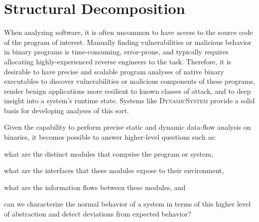 \documentclass[letterpaper,twoside,11pt,headings=small]{scrartcl}
\newcommand{\dynamicsys}{\textsc{DynamicSystem}\xspace}
\begin{document}


\section{Structural Decomposition}
\label{sec:research:structure}

\cite{csallner:icse2008:dysy}
\cite{krka:icsa2010:inference}
\cite{chipounov:asplos2011:s2e}

When analyzing software, it is often uncommon to have access to the source
code of the program of interest.  Manually finding vulnerabilities or
malicious behavior in binary programs is time-consuming, error-prone, and
typically requires allocating highly-experienced reverse engineers to the
task. Therefore, it is desirable to have precise and scalable program analyses
of native binary executables to discover vulnerabilities or malicious
components of these programs, render benign applications more resilient to
known classes of attack, and to deep insight into a system's runtime state.
Systems like \dynamicsys provide a solid basis for developing analyses of this
sort.

Given the capability to perform precise static and dynamic data-flow analysis
on binaries, it becomes possible to answer higher-level questions such as:
\begin{inparaenum}[i)]
    \item what are the distinct modules that comprise the program or system,
    \item what are the interfaces that these modules expose to their environment,
    \item what are the information flows between these modules, and
    \item can we characterize the normal behavior of a system in terms of this higher
        level of abstraction and detect deviations from expected behavior?
\end{inparaenum}
\end{document}

